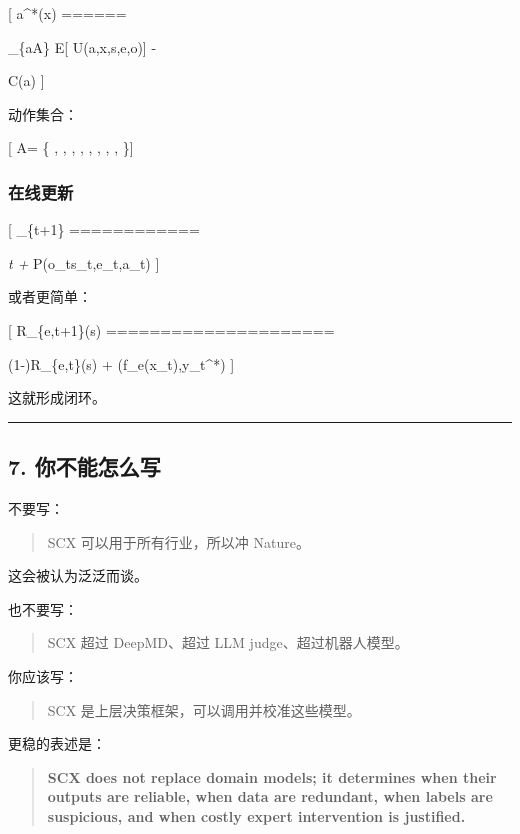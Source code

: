 \documentclass[
  12pt,
]{ctexart}
\begin{document}
{[} a\^{}*(x) ======

\arg\max\_\{a\in\mathcal A\} \mathbb E{[} U(a,x,s,e,o){]} -

\lambda C(a) {]}

动作集合：

{[} \mathcal A= \{ , , ,
, , , ,
,  \}{]}

\subsubsection{在线更新}\label{ux5728ux7ebfux66f4ux65b0}

{[} \theta\_\{t+1\} ============

\theta\emph{t + \eta\nabla}\theta \log P(o\_t\mid s\_t,e\_t,a\_t) {]}

或者更简单：

{[} \widehat R\_\{e,t+1\}(s) =====================

(1-\alpha)\widehat R\_\{e,t\}(s) + \alpha \ell(f\_e(x\_t),y\_t\^{}*) {]}

这就形成闭环。

\begin{center}\rule{0.5\linewidth}{0.5pt}\end{center}

\subsection{7. 你不能怎么写}\label{ux4f60ux4e0dux80fdux600eux4e48ux5199}

不要写：

\begin{quote}
SCX 可以用于所有行业，所以冲 Nature。
\end{quote}

这会被认为泛泛而谈。

也不要写：

\begin{quote}
SCX 超过 DeepMD、超过 LLM judge、超过机器人模型。
\end{quote}

你应该写：

\begin{quote}
SCX 是上层决策框架，可以调用并校准这些模型。
\end{quote}

更稳的表述是：

\begin{quote}
\textbf{SCX does not replace domain models; it determines when their
outputs are reliable, when data are redundant, when labels are
suspicious, and when costly expert intervention is justified.}
\end{quote}
\end{document}
